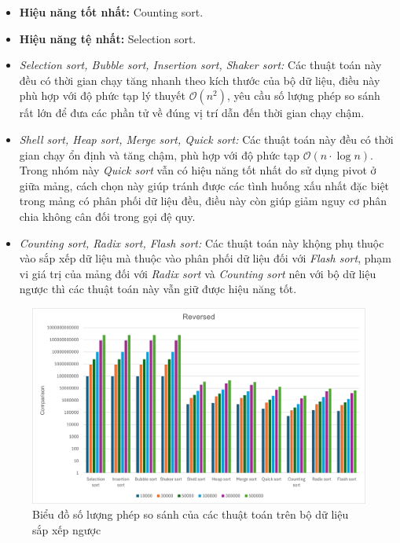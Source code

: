     \begin{itemize}
        \item \textbf{Hiệu năng tốt nhất:} Counting sort.
        \item \textbf{Hiệu năng tệ nhất:} Selection sort. 
        \item \textit{Selection sort, Bubble sort, Insertion sort, Shaker sort:} Các thuật toán này đều có thời gian chạy tăng nhanh theo kích thước của bộ dữ liệu, điều này phù hợp với độ phức tạp lý thuyết $\mathcal{O}(n^2)$, yêu cầu số lượng phép so sánh rất lớn để đưa các phần tử về đúng vị trí dẫn đến thời gian chạy chậm.
        \item \textit{Shell sort, Heap sort, Merge sort, Quick sort:} Các thuật toán này đều có thời gian chạy ổn định và tăng chậm, phù hợp với độ phức tạp $\mathcal{O}(n \cdot \log n)$. Trong nhóm này \textit{Quick sort} vẫn có hiệu năng tốt nhất do sử dụng pivot ở giữa mảng, cách chọn này giúp tránh được các tình huống xấu nhất đặc biệt trong mảng có phân phối dữ liệu đều, điều này còn giúp giảm nguy cơ phân chia không cân đối trong gọi đệ quy.
        \item \textit{Counting sort, Radix sort, Flash sort:} Các thuật toán này khộng phụ thuộc vào sắp xếp dữ liệu mà thuộc vào phân phối dữ liệu đối với \textit{Flash sort}, phạm vi giá trị của mảng đối với \textit{Radix sort} và \textit{Counting sort} nên với bộ dữ liệu ngược thì các thuật toán này vẫn giữ được hiệu năng tốt.
    \end{itemize}

    \newpage

    \begin{figure}[H]
        \centering
        \includegraphics[width = 0.9\linewidth]{img/experiment/comparison/reversed.png}
        \caption{Biểu đồ số lượng phép so sánh của các thuật toán trên bộ dữ liệu sắp xếp ngược}
    \end{figure}

